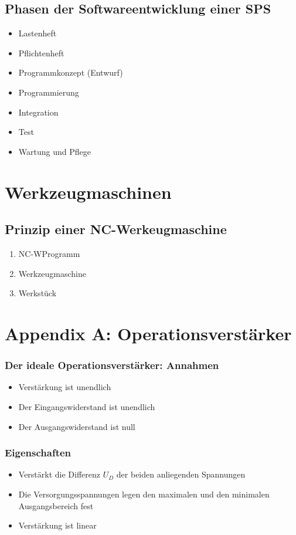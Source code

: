\subsection{Phasen der Softwareentwicklung einer SPS}
\begin{itemize}
	\item Lastenheft
	\item Pflichtenheft
	\item Programmkonzept (Entwurf)
	\item Programmierung
	\item Integration
	\item Test
	\item Wartung und Pflege
\end{itemize}



\section{Werkzeugmaschinen}

\subsection{Prinzip einer NC-Werkeugmaschine}
\begin{enumerate}
	\item NC-WProgramm
	\item Werkzeugmaschine
	\item Werkstück
\end{enumerate}



\section{Appendix A: Operationsverstärker}

\subsubsection{Der ideale Operationsverstärker: Annahmen}
\begin{itemize}
	\item Verstärkung ist unendlich
	\item Der Eingangswiderstand ist unendlich
	\item Der Ausgangswiderstand ist null
\end{itemize}

\subsubsection{Eigenschaften}
\begin{itemize}
	\item Verstärkt die Differenz $U_D$ der beiden anliegenden Spannungen
	\item Die Versorgungsspannungen legen den maximalen und den minimalen Ausgangsbereich fest
	\item Verstärkung ist linear
\end{itemize}


